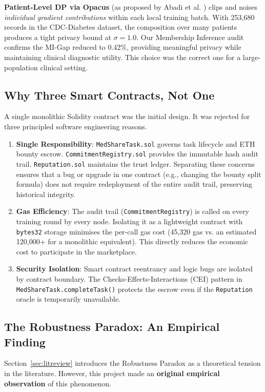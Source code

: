 \documentclass[10pt, a4paper, twocolumn]{article}
\begin{document}
\textbf{Patient-Level DP via Opacus} (as proposed by Abadi et al. \cite{abadi2016}) clips and noises \textit{individual gradient contributions} within each local training batch. With 253,680 records in the CDC-Diabetes dataset, the composition over many patients produces a tight privacy bound at $\sigma = 1.0$. Our Membership Inference audit confirms the MI-Gap reduced to 0.42\%, providing meaningful privacy while maintaining clinical diagnostic utility. This choice was the correct one for a large-population clinical setting.

\subsection{Why Three Smart Contracts, Not One}
A single monolithic Solidity contract was the initial design. It was rejected for three principled software engineering reasons.

\begin{enumerate}
    \item \textbf{Single Responsibility}: \texttt{MedShareTask.sol} governs task lifecycle and ETH bounty escrow. \texttt{CommitmentRegistry.sol} provides the immutable hash audit trail. \texttt{Reputation.sol} maintains the trust ledger. Separating these concerns ensures that a bug or upgrade in one contract (e.g., changing the bounty split formula) does not require redeployment of the entire audit trail, preserving historical integrity.
    \item \textbf{Gas Efficiency}: The audit trail (\texttt{CommitmentRegistry}) is called on every training round by every node. Isolating it as a lightweight contract with \texttt{bytes32} storage minimises the per-call gas cost (45,320 gas vs. an estimated 120,000+ for a monolithic equivalent). This directly reduces the economic cost to participate in the marketplace.
    \item \textbf{Security Isolation}: Smart contract reentrancy and logic bugs are isolated by contract boundary. The Checks-Effects-Interactions (CEI) pattern in \texttt{MedShareTask.completeTask()} protects the escrow even if the \texttt{Reputation} oracle is temporarily unavailable.
\end{enumerate}

\subsection{The Robustness Paradox: An Empirical Finding}
Section~\ref{sec:litreview} introduces the Robustness Paradox as a theoretical tension in the literature. However, this project made an \textbf{original empirical observation} of this phenomenon.
\end{document}
